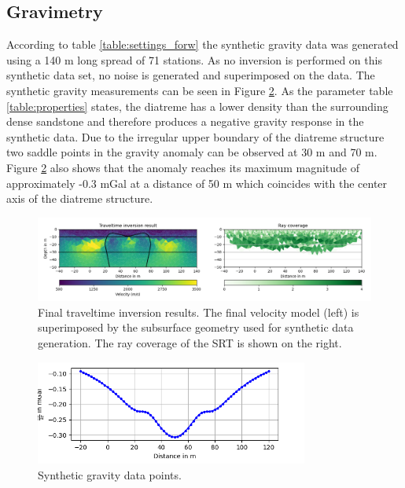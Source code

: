 \subsection{Gravimetry}
According to table \ref{table:settings_forw} the synthetic gravity data was generated using a 140 m long spread of 71 stations. As no inversion is performed on this synthetic data set, no noise is generated and superimposed on the data. The synthetic gravity measurements can be seen in Figure \ref{figure:grav}. As the parameter table \ref{table:properties} states, the diatreme has a lower density than the surrounding dense sandstone and therefore produces a negative gravity response in the synthetic data. Due to the irregular upper boundary of the diatreme structure two saddle points in the gravity anomaly can be observed at 30 m and 70 m. Figure \ref{figure:grav} also shows that the anomaly reaches its maximum magnitude of approximately -0.3 mGal at a distance of 50 m which coincides with the center axis of the diatreme structure.

\begin{figure}[H]
  \centering
    \includegraphics[width=\textwidth]{Figures/TT_comp.png}
    \caption[Final velocity model after inversion]{Final traveltime inversion results. The final velocity model (left) is superimposed by the subsurface geometry used for synthetic data generation. The ray coverage of the SRT is shown on the right.}
    \label{figure:TT_inversion_comp}
\end{figure}
\begin{figure}[H]
  \centering
  \includegraphics[width=0.8\textwidth]{Figures/GRVA_dataonly.png}
    \caption[Synthetic gravity data]{Synthetic gravity data points.}
    \label{figure:grav}
\end{figure}


